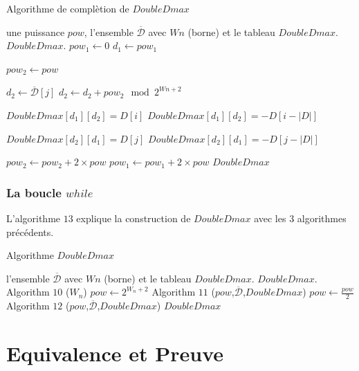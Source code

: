 \documentclass[12pt, a4paper]{memoir}
\newcommand{\dbarre}{\overline{\mathcal{D}}}
\begin{document}
   \begin{algorithm}
 \caption{Algorithme de complètion de $DoubleDmax$}
 \begin{algorithmic}
  \REQUIRE une puissance $pow$, l'ensemble $\dbarre$ avec $Wn$ (borne) et le tableau $DoubleDmax$.
  \ENSURE $DoubleDmax$.
  \STATE $pow_1 \leftarrow 0$
  \STATE $d_1 \leftarrow pow_1$

  \STATE $pow_2 \leftarrow pow$
  
  \FOR{$j$ allant de $0$ à $|\dbarre|$}
  \STATE $d_2 \leftarrow \dbarre[j]$
  \STATE $d_2 \leftarrow d_2 + pow_2 \mod 2^{Wn+2}$
  
  
  \STATE $DoubleDmax[d_1][d_2] = D[i]$
  \ELSE 
  \STATE $DoubleDmax[d_1][d_2] = -D[i-|D|]$
  \ENDIF
  
  \STATE $DoubleDmax[d_2][d_1] = D[j]$
  \ELSE 
  \STATE $DoubleDmax[d_2][d_1] = -D[j-|D|]$
  \ENDIF
  
  \ENDIF
  
  \ENDFOR
  \STATE $pow_2 \leftarrow pow_2 + 2 \times pow$
  \ENDWHILE
  \STATE $pow_1 \leftarrow pow_1 + 2 \times pow$
  \ENDWHILE
  \RETURN $DoubleDmax$
 \end{algorithmic}
\end{algorithm}

   \subsubsection{La boucle $while$}
   
   L'algorithme $13$ explique la construction de $DoubleDmax$ avec les $3$ algorithmes précédents.
   
\begin{algorithm}
 \caption{Algorithme $DoubleDmax$}
 \begin{algorithmic}
  \REQUIRE l'ensemble $\dbarre$ avec $Wn$ (borne) et le tableau $DoubleDmax$.
  \ENSURE $DoubleDmax$.
  \STATE Algorithm $10$ ($W_n$)
  \STATE $pow \leftarrow 2^{W_n+2}$
  \STATE Algorithm $11$ ($pow$,$\dbarre$,$DoubleDmax$)
  \STATE $pow \leftarrow \frac{pow}{2}$
  \STATE Algorithm $12$ ($pow$,$\dbarre$,$DoubleDmax$)
  \ENDWHILE
  \RETURN $DoubleDmax$
 \end{algorithmic}
\end{algorithm}
      
  \section{Equivalence et Preuve}
  
\end{document}
